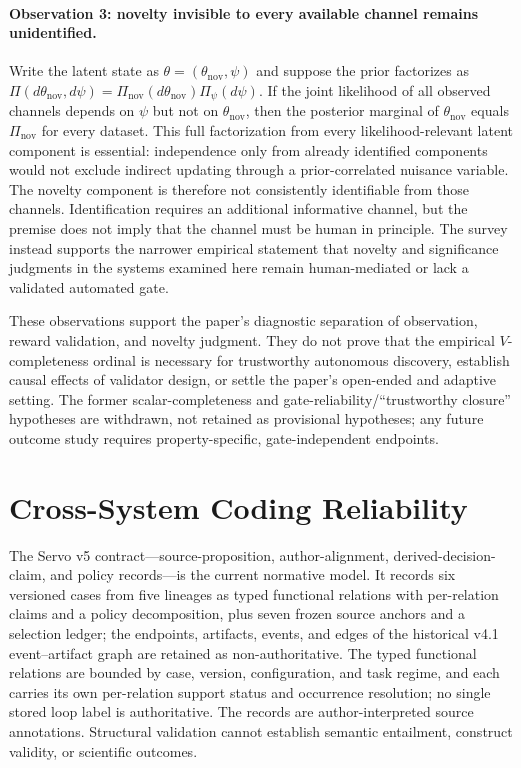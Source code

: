 \documentclass{article}
\begin{document}
\paragraph{Observation 3: novelty invisible to every available channel remains unidentified.}
Write the latent state as $\theta=(\theta_{\mathrm{nov}},\psi)$ and suppose the prior factorizes as $\Pi(d\theta_{\mathrm{nov}},d\psi)=\Pi_{\mathrm{nov}}(d\theta_{\mathrm{nov}})\Pi_\psi(d\psi)$. If the joint likelihood of all observed channels depends on $\psi$ but not on $\theta_{\mathrm{nov}}$, then the posterior marginal of $\theta_{\mathrm{nov}}$ equals $\Pi_{\mathrm{nov}}$ for every dataset. This full factorization from every likelihood-relevant latent component is essential: independence only from already identified components would not exclude indirect updating through a prior-correlated nuisance variable. The novelty component is therefore not consistently identifiable from those channels. Identification requires an additional informative channel, but the premise does not imply that the channel must be human in principle. The survey instead supports the narrower empirical statement that novelty and significance judgments in the systems examined here remain human-mediated or lack a validated automated gate.

These observations support the paper's diagnostic separation of observation, reward validation, and novelty judgment. They do not prove that the empirical $V$-completeness ordinal is necessary for trustworthy autonomous discovery, establish causal effects of validator design, or settle the paper's open-ended and adaptive setting. The former scalar-completeness and gate-reliability/``trustworthy closure'' hypotheses are withdrawn, not retained as provisional hypotheses; any future outcome study requires property-specific, gate-independent endpoints.

\section{Cross-System Coding Reliability}
\label{app:coding}

The Servo v5 contract---source-proposition, author-alignment, derived-decision-claim, and policy records---is the current normative model. It records six versioned cases from five lineages as typed functional relations with per-relation claims and a policy decomposition, plus seven frozen source anchors and a selection ledger; the endpoints, artifacts, events, and edges of the historical v4.1 event--artifact graph are retained as non-authoritative. The typed functional relations are bounded by case, version, configuration, and task regime, and each carries its own per-relation support status and occurrence resolution; no single stored loop label is authoritative. The records are author-interpreted source annotations. Structural validation cannot establish semantic entailment, construct validity, or scientific outcomes.
\end{document}
